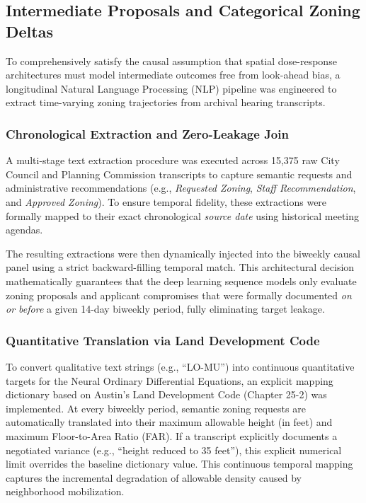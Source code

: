 \subsection{Intermediate Proposals and Categorical Zoning Deltas}

To comprehensively satisfy the causal assumption that spatial dose-response architectures must model intermediate outcomes free from look-ahead bias, a longitudinal Natural Language Processing (NLP) pipeline was engineered to extract time-varying zoning trajectories from archival hearing transcripts. 

\subsubsection{Chronological Extraction and Zero-Leakage Join}
A multi-stage text extraction procedure was executed across 15,375 raw City Council and Planning Commission transcripts to capture semantic requests and administrative recommendations (e.g., \textit{Requested Zoning}, \textit{Staff Recommendation}, and \textit{Approved Zoning}). To ensure temporal fidelity, these extractions were formally mapped to their exact chronological \textit{source date} using historical meeting agendas. 

The resulting extractions were then dynamically injected into the biweekly causal panel using a strict backward-filling temporal match. This architectural decision mathematically guarantees that the deep learning sequence models only evaluate zoning proposals and applicant compromises that were formally documented \textit{on or before} a given 14-day biweekly period, fully eliminating target leakage.

\subsubsection{Quantitative Translation via Land Development Code}
To convert qualitative text strings (e.g., ``LO-MU'') into continuous quantitative targets for the Neural Ordinary Differential Equations, an explicit mapping dictionary based on Austin's Land Development Code (Chapter 25-2) was implemented. At every biweekly period, semantic zoning requests are automatically translated into their maximum allowable height (in feet) and maximum Floor-to-Area Ratio (FAR). If a transcript explicitly documents a negotiated variance (e.g., ``height reduced to 35 feet''), this explicit numerical limit overrides the baseline dictionary value. This continuous temporal mapping captures the incremental degradation of allowable density caused by neighborhood mobilization.

